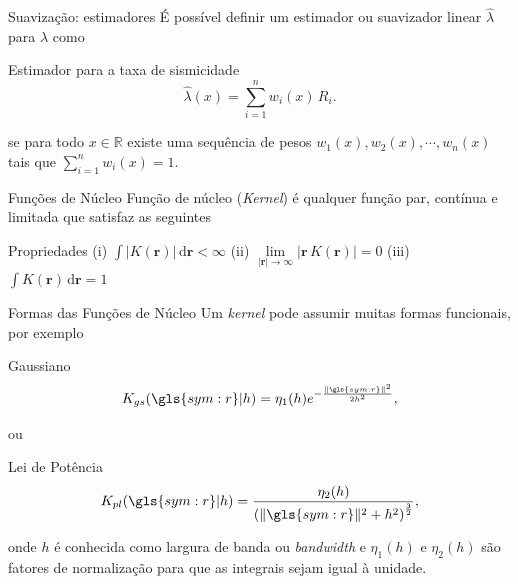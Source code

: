 \documentclass[ucs,8pt]{beamer}
\begin{document}
\begin{frame}{Suavização: estimadores}
É possível definir um estimador ou suavizador linear $\hat{\lambda}$ para $\lambda$
como
	\begin{block}{Estimador para a taxa de sismicidade}
		\begin{equation}
			\ensuremath{
				\hat{\lambda}(x) = \sum_{i=1}^{n}w_i(x)\,R_i.
			}
		\label{eq:rate_estim}
		\end{equation}
	\end{block}
se para todo $x \in \mathbb{R}$ existe uma sequência de pesos $w_1(x),
w_2(x),\cdots,w_n(x)$ tais que $\sum_{i=1}^{n}w_i(x) = 1$.
\end{frame}



\begin{frame}{Funções de Núcleo}
Função de núcleo (\emph{Kernel}) é qualquer função par, contínua e limitada que satisfaz as seguintes
	\begin{block}{Propriedades}
		\centering
		(i) $\int \lvert K(\boldsymbol{r})\rvert \,\mathrm{d}\boldsymbol{r} < \infty $
		\;\;\;\;\;(ii) $\underset{ \lvert\boldsymbol{r} \rvert \to \infty }{\lim} 
						\lvert \boldsymbol{r} \, K(\boldsymbol{r})\rvert =0$ 
		\;\;\;\;\;(iii) $\int \! K(\boldsymbol{r})	\,\mathrm{d}\boldsymbol{r} = 1 $
	\end{block}
\end{frame}


\begin{frame}{Formas das Funções de Núcleo}
	Um \emph{kernel} pode assumir muitas formas funcionais, por exemplo 
	\begin{block}{Gaussiano}
		\begin{equation}
			\ensuremath{
				K_{gs}(\gls{sym:r}\arrowvert h) = \eta_1(h)
					e^{- \frac{\|\gls{sym:r}\|^2}
		 				 	  {2 h^2 }},
		 	}
		\label{eq:kernel_gs}
		\end{equation}
	\end{block}
ou
	\begin{block}{Lei de Potência}
		\begin{equation}
			\ensuremath{
				K_{pl}(\gls{sym:r}\arrowvert h) = 
					\frac{\eta_2(h)}
		 				 {\left( \|\gls{sym:r}\|^2 + h^2 \right)^{\frac{3}{2}} },
		 	}
		\label{eq:kernel_pl}
		\end{equation}
	\end{block}
	onde $h$ é conhecida como \alert{largura de banda} ou
	\emph{bandwidth} e $\eta_1(h)$ e $\eta_2(h)$ são fatores de normalização para
	que as integrais sejam igual à unidade.
\end{frame}
\end{document}
